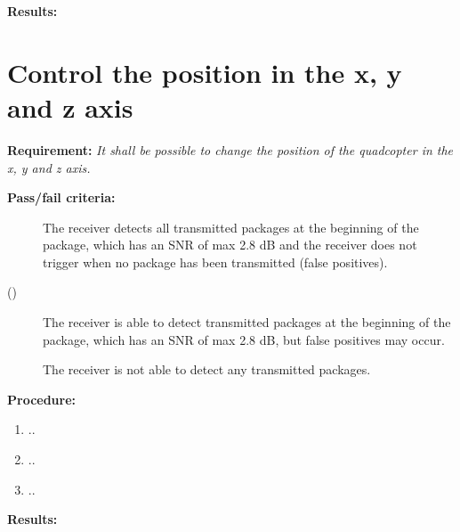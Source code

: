 \textbf{Results:}


\newpage

\section{Control the position in the x, y and z axis}
\textbf{Requirement:}
\textit{It shall be possible to change the position of the quadcopter in the x, y and z axis.}

\textbf{Pass/fail criteria:}
	\begin{description}
	\item[  ] The receiver detects all transmitted packages at the beginning of the package, which has an SNR of max 2.8 dB and the receiver does not trigger when no package has been transmitted (false positives).
	\item[()]The receiver is able to detect transmitted packages at the beginning of the package, which has an SNR of max 2.8 dB, but false positives may occur.
	\item[  \phantom{)}]The receiver is not able to detect any transmitted packages.
	\end{description}

		
\textbf{Procedure:}\\


\begin{enumerate}
	\item ..
	\item ..
	\item ..
\end{enumerate} 


\textbf{Results:}

\newpage
